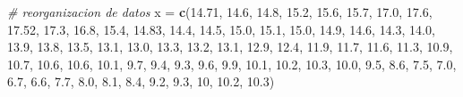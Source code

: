 \documentclass[]{article}
\newenvironment{Shaded}{\begin{snugshade}}{\end{snugshade}}
\newcommand{\KeywordTok}[1]{\textcolor[rgb]{0.13,0.29,0.53}{\textbf{#1}}}
\newcommand{\DecValTok}[1]{\textcolor[rgb]{0.00,0.00,0.81}{#1}}
\newcommand{\FloatTok}[1]{\textcolor[rgb]{0.00,0.00,0.81}{#1}}
\newcommand{\StringTok}[1]{\textcolor[rgb]{0.31,0.60,0.02}{#1}}
\newcommand{\CommentTok}[1]{\textcolor[rgb]{0.56,0.35,0.01}{\textit{#1}}}
\newcommand{\NormalTok}[1]{#1}
\begin{document}
\begin{Shaded}
\begin{Highlighting}[]
\CommentTok{# reorganizacion de datos }
\NormalTok{x =}\StringTok{ }\KeywordTok{c}\NormalTok{(}\FloatTok{14.71}\NormalTok{, }\FloatTok{14.6}\NormalTok{, }\FloatTok{14.8}\NormalTok{, }\FloatTok{15.2}\NormalTok{, }\FloatTok{15.6}\NormalTok{, }\FloatTok{15.7}\NormalTok{, }\FloatTok{17.0}\NormalTok{, }\FloatTok{17.6}\NormalTok{, }\FloatTok{17.52}\NormalTok{, }\FloatTok{17.3}\NormalTok{, }
  \FloatTok{16.8}\NormalTok{, }\FloatTok{15.4}\NormalTok{, }\FloatTok{14.83}\NormalTok{, }\FloatTok{14.4}\NormalTok{, }\FloatTok{14.5}\NormalTok{, }
  \FloatTok{15.0}\NormalTok{, }\FloatTok{15.1}\NormalTok{, }\FloatTok{15.0}\NormalTok{, }\FloatTok{14.9}\NormalTok{, }\FloatTok{14.6}\NormalTok{, }\FloatTok{14.3}\NormalTok{, }\FloatTok{14.0}\NormalTok{, }\FloatTok{13.9}\NormalTok{, }\FloatTok{13.8}\NormalTok{, }\FloatTok{13.5}\NormalTok{, }\FloatTok{13.1}\NormalTok{, }\FloatTok{13.0}\NormalTok{, }
  \FloatTok{13.3}\NormalTok{, }\FloatTok{13.2}\NormalTok{, }\FloatTok{13.1}\NormalTok{, }\FloatTok{12.9}\NormalTok{, }\FloatTok{12.4}\NormalTok{, }\FloatTok{11.9}\NormalTok{, }\FloatTok{11.7}\NormalTok{, }\FloatTok{11.6}\NormalTok{, }\FloatTok{11.3}\NormalTok{, }\FloatTok{10.9}\NormalTok{, }
  \FloatTok{10.7}\NormalTok{, }\FloatTok{10.6}\NormalTok{, }\FloatTok{10.6}\NormalTok{, }\FloatTok{10.1}\NormalTok{, }\FloatTok{9.7}\NormalTok{, }\FloatTok{9.4}\NormalTok{, }\FloatTok{9.3}\NormalTok{, }\FloatTok{9.6}\NormalTok{, }\FloatTok{9.9}\NormalTok{, }\FloatTok{10.1}\NormalTok{, }\FloatTok{10.2}\NormalTok{, }\FloatTok{10.3}\NormalTok{,  }\FloatTok{10.0}\NormalTok{, }\FloatTok{9.5}\NormalTok{, }
  \FloatTok{8.6}\NormalTok{, }\FloatTok{7.5}\NormalTok{, }\FloatTok{7.0}\NormalTok{, }\FloatTok{6.7}\NormalTok{, }\FloatTok{6.6}\NormalTok{, }\FloatTok{7.7}\NormalTok{, }
  \FloatTok{8.0}\NormalTok{, }\FloatTok{8.1}\NormalTok{, }\FloatTok{8.4}\NormalTok{, }\FloatTok{9.2}\NormalTok{, }\FloatTok{9.3}\NormalTok{, }\DecValTok{10}\NormalTok{, }\FloatTok{10.2}\NormalTok{, }\FloatTok{10.3}\NormalTok{)}


\end{Highlighting}
\end{Shaded}
\end{document}
